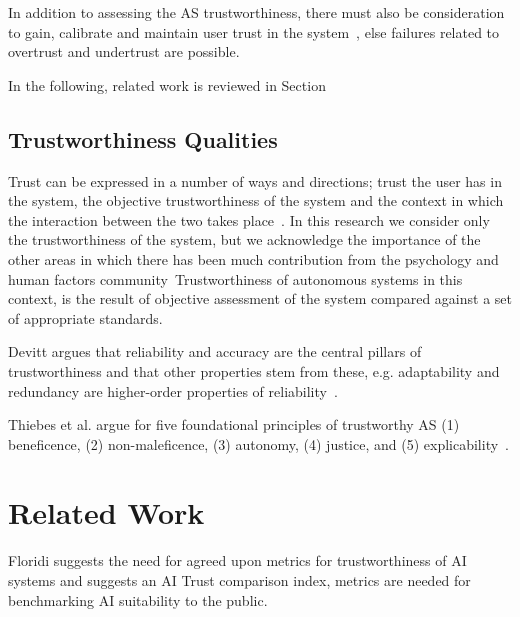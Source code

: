 In addition to assessing the AS trustworthiness, there must also be consideration to gain, calibrate and maintain user trust in the system~\cite{kok2020trust, Chiou2021}, else failures related to overtrust and undertrust are possible. 


In the following, related work is reviewed in Section



\subsection{Trustworthiness Qualities}

Trust can be expressed in a number of ways and directions; trust the user has in the system, the objective trustworthiness of the system and the context in which the interaction between the two takes place~\cite{Hancock2021}. 
%
In this research we consider only the trustworthiness of the system, but we acknowledge the importance of the other areas in which there has been much contribution from the psychology and human factors community~\cite{Floridi2019,Lee2004,kok2020trust,Chiou2021,Kohn2021}Trustworthiness of autonomous systems in this context, is the result of objective assessment of the system compared against a set of appropriate standards.

Devitt argues that reliability and accuracy are the central pillars of trustworthiness and that other properties stem from these, e.g. adaptability and redundancy are higher-order properties of reliability~\cite{devitt2018trustworthiness}. 

Thiebes et al. argue for five foundational principles of trustworthy AS (1) beneficence, (2) non-maleficence, (3) autonomy, (4) justice, and (5) explicability~\cite{Thiebes2021}.  


\section{Related Work}\label{Related_work}

Floridi suggests the need for agreed upon metrics for trustworthiness of AI systems and suggests an  AI Trust comparison index, metrics are needed for benchmarking AI suitability to the public.

